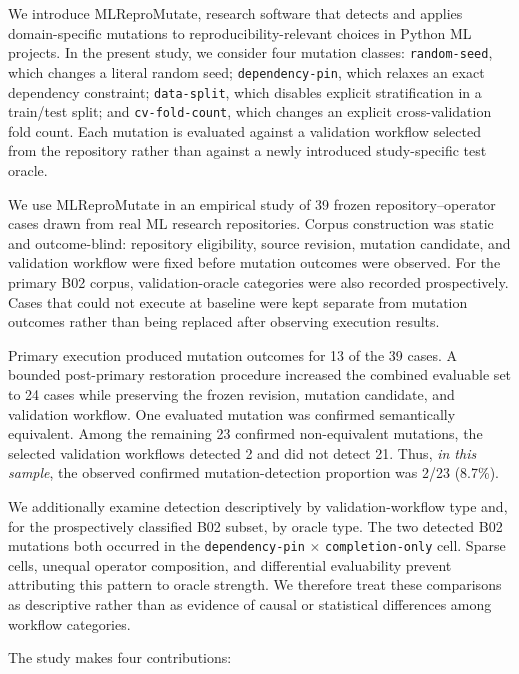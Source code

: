 We introduce MLReproMutate, research software that detects and applies
domain-specific mutations to reproducibility-relevant choices in Python ML
projects. In the present study, we consider four mutation classes:
\texttt{random-seed}, which changes a literal random seed;
\texttt{dependency-pin}, which relaxes an exact dependency constraint;
\texttt{data-split}, which disables explicit stratification in a
train/test split; and \texttt{cv-fold-count}, which changes an explicit
cross-validation fold count. Each mutation is evaluated against a validation
workflow selected from the repository rather than against a newly introduced
study-specific test oracle.

We use MLReproMutate in an empirical study of 39 frozen
repository--operator cases drawn from real ML research repositories. Corpus
construction was static and outcome-blind: repository eligibility, source
revision, mutation candidate, and validation workflow were fixed before
mutation outcomes were observed. For the primary B02 corpus, validation-oracle
categories were also recorded prospectively. Cases that could not execute at
baseline were kept separate from mutation outcomes rather than being replaced
after observing execution results.

Primary execution produced mutation outcomes for 13 of the 39 cases. A bounded
post-primary restoration procedure increased the combined evaluable set to 24
cases while preserving the frozen revision, mutation candidate, and validation
workflow. One evaluated mutation was confirmed semantically equivalent. Among
the remaining 23 confirmed non-equivalent mutations, the selected validation
workflows detected 2 and did not detect 21. Thus, \emph{in this sample}, the
observed confirmed mutation-detection proportion was 2/23 (8.7\%).

We additionally examine detection descriptively by validation-workflow type and,
for the prospectively classified B02 subset, by oracle type. The two detected
B02 mutations both occurred in the
\texttt{dependency-pin} $\times$ \texttt{completion-only} cell. Sparse cells,
unequal operator composition, and differential evaluability prevent attributing
this pattern to oracle strength. We therefore treat these comparisons as
descriptive rather than as evidence of causal or statistical differences among
workflow categories.

The study makes four contributions:

